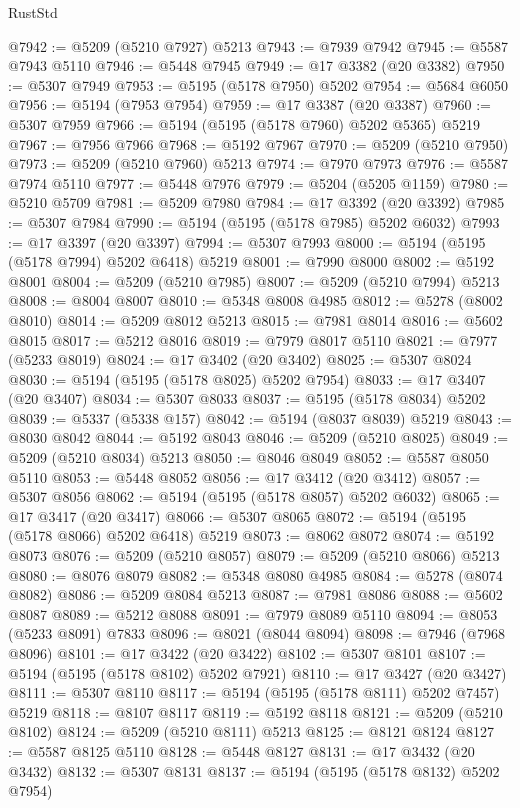 \begin{lexlean}{RustStd}
\begin{coremodule}
@7942 := @5209 (@5210 @7927) @5213
@7943 := @7939 @7942
@7945 := @5587 @7943 @5110
@7946 := @5448 @7945
@7949 := @17 @3382 (@20 @3382)
@7950 := @5307 @7949
@7953 := @5195 (@5178 @7950) @5202
@7954 := @5684 @6050
@7956 := @5194 (@7953 @7954)
@7959 := @17 @3387 (@20 @3387)
@7960 := @5307 @7959
@7966 := @5194 (@5195 (@5178 @7960) @5202 @5365) @5219
@7967 := @7956 @7966
@7968 := @5192 @7967
@7970 := @5209 (@5210 @7950)
@7973 := @5209 (@5210 @7960) @5213
@7974 := @7970 @7973
@7976 := @5587 @7974 @5110
@7977 := @5448 @7976
@7979 := @5204 (@5205 @1159)
@7980 := @5210 @5709
@7981 := @5209 @7980
@7984 := @17 @3392 (@20 @3392)
@7985 := @5307 @7984
@7990 := @5194 (@5195 (@5178 @7985) @5202 @6032)
@7993 := @17 @3397 (@20 @3397)
@7994 := @5307 @7993
@8000 := @5194 (@5195 (@5178 @7994) @5202 @6418) @5219
@8001 := @7990 @8000
@8002 := @5192 @8001
@8004 := @5209 (@5210 @7985)
@8007 := @5209 (@5210 @7994) @5213
@8008 := @8004 @8007
@8010 := @5348 @8008 @4985
@8012 := @5278 (@8002 @8010)
@8014 := @5209 @8012 @5213
@8015 := @7981 @8014
@8016 := @5602 @8015
@8017 := @5212 @8016
@8019 := @7979 @8017 @5110
@8021 := @7977 (@5233 @8019)
@8024 := @17 @3402 (@20 @3402)
@8025 := @5307 @8024
@8030 := @5194 (@5195 (@5178 @8025) @5202 @7954)
@8033 := @17 @3407 (@20 @3407)
@8034 := @5307 @8033
@8037 := @5195 (@5178 @8034) @5202
@8039 := @5337 (@5338 @157)
@8042 := @5194 (@8037 @8039) @5219
@8043 := @8030 @8042
@8044 := @5192 @8043
@8046 := @5209 (@5210 @8025)
@8049 := @5209 (@5210 @8034) @5213
@8050 := @8046 @8049
@8052 := @5587 @8050 @5110
@8053 := @5448 @8052
@8056 := @17 @3412 (@20 @3412)
@8057 := @5307 @8056
@8062 := @5194 (@5195 (@5178 @8057) @5202 @6032)
@8065 := @17 @3417 (@20 @3417)
@8066 := @5307 @8065
@8072 := @5194 (@5195 (@5178 @8066) @5202 @6418) @5219
@8073 := @8062 @8072
@8074 := @5192 @8073
@8076 := @5209 (@5210 @8057)
@8079 := @5209 (@5210 @8066) @5213
@8080 := @8076 @8079
@8082 := @5348 @8080 @4985
@8084 := @5278 (@8074 @8082)
@8086 := @5209 @8084 @5213
@8087 := @7981 @8086
@8088 := @5602 @8087
@8089 := @5212 @8088
@8091 := @7979 @8089 @5110
@8094 := @8053 (@5233 @8091) @7833
@8096 := @8021 (@8044 @8094)
@8098 := @7946 (@7968 @8096)
@8101 := @17 @3422 (@20 @3422)
@8102 := @5307 @8101
@8107 := @5194 (@5195 (@5178 @8102) @5202 @7921)
@8110 := @17 @3427 (@20 @3427)
@8111 := @5307 @8110
@8117 := @5194 (@5195 (@5178 @8111) @5202 @7457) @5219
@8118 := @8107 @8117
@8119 := @5192 @8118
@8121 := @5209 (@5210 @8102)
@8124 := @5209 (@5210 @8111) @5213
@8125 := @8121 @8124
@8127 := @5587 @8125 @5110
@8128 := @5448 @8127
@8131 := @17 @3432 (@20 @3432)
@8132 := @5307 @8131
@8137 := @5194 (@5195 (@5178 @8132) @5202 @7954)

\end{coremodule}
\end{lexlean}
